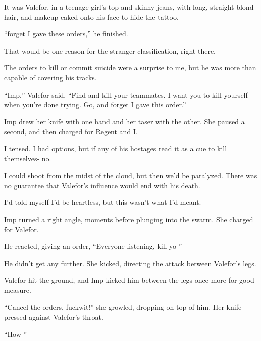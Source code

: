 It was Valefor, in a teenage girl's top and skinny jeans, with long, straight blond hair, and makeup caked onto his face to hide the tattoo.



``\ldotsand forget I gave these orders,'' he finished.



That would be one reason for the stranger classification, right there.



The orders to kill or commit suicide were a surprise to me, but he was more than capable of covering his tracks.



``Imp,'' Valefor said.  ``Find and kill your teammates.  I want you to kill yourself when you're done trying.  Go, and forget I gave this order.''



Imp drew her knife with one hand and her taser with the other.  She paused a second, and then charged for Regent and I.



I tensed.  I had options, but if any of his hostages read it as a cue to kill themselves-  no.



I could shoot from the midst of the cloud, but then we'd be paralyzed.  There was no guarantee that Valefor's influence would end with his death.



I'd told myself I'd be heartless, but this wasn't what I'd meant.



Imp turned a right angle, moments before plunging into the swarm.  She charged for Valefor.



He reacted, giving an order, ``Everyone listening, kill yo-''



He didn't get any further.  She kicked, directing the attack between Valefor's legs.



Valefor hit the ground, and Imp kicked him between the legs once more for good measure.



``Cancel the orders, fuckwit!'' she growled, dropping on top of him.  Her knife pressed against Valefor's throat.



``How-''



